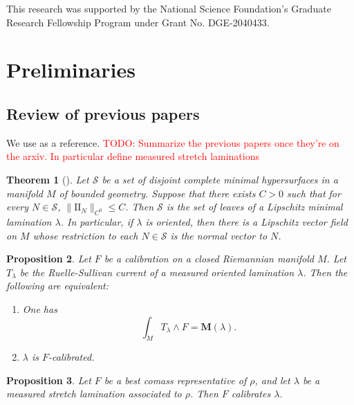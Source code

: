 \documentclass[reqno,11pt]{amsart}
\newcommand{\Two}{\mathrm{I\!I}}
\newcommand{\Mass}{\mathbf M}
\newtheorem{theorem}{Theorem}[section]
\newtheorem{proposition}[theorem]{Proposition}
\theoremstyle{definition}
\numberwithin{equation}{section}
\newcommand\todo[1]{\textcolor{red}{TODO: #1}}
\begin{document}
This research was supported by the National Science Foundation's Graduate Research Fellowship Program under Grant No. DGE-2040433.

\section{Preliminaries}\label{prevResults}
\subsection{Review of previous papers}
We use \cite{BackusCML, BackusBest1} as a reference.
\todo{Summarize the previous papers once they're on the arxiv. In particular define measured stretch laminations}

\begin{theorem}[{\cite[Theorem A]{BackusCML}}]\label{disjoint surfaces are lamination}
Let $\mathcal S$ be a set of disjoint complete minimal hypersurfaces in a manifold $M$ of bounded geometry.
Suppose that there exists $C > 0$ such that for every $N \in \mathcal S$, $\|\Two_N\|_{C^0} \leq C$.
Then $\mathcal S$ is the set of leaves of a Lipschitz minimal lamination $\lambda$.
In particular, if $\lambda$ is oriented, then there is a Lipschitz vector field on $M$ whose restriction to each $N \in \mathcal S$ is the normal vector to $N$.
\end{theorem}

\begin{proposition}\label{calibration condition}
Let $F$ be a calibration on a closed Riemannian manifold $M$.
Let $T_\lambda$ be the Ruelle-Sullivan current of a measured oriented lamination $\lambda$.
Then the following are equivalent:
\begin{enumerate}
\item One has \begin{equation}\label{calibration by Ruelle Sullivan}
\int_M T_\lambda \wedge F = \Mass(\lambda).
\end{equation}
\item $\lambda$ is $F$-calibrated.
\end{enumerate}
\end{proposition}

\begin{proposition}\label{MCL contains Thurston}
Let $F$ be a best comass representative of $\rho$, and let $\lambda$ be a measured stretch lamination associated to $\rho$.
Then $F$ calibrates $\lambda$.
\end{proposition}
\end{document}

